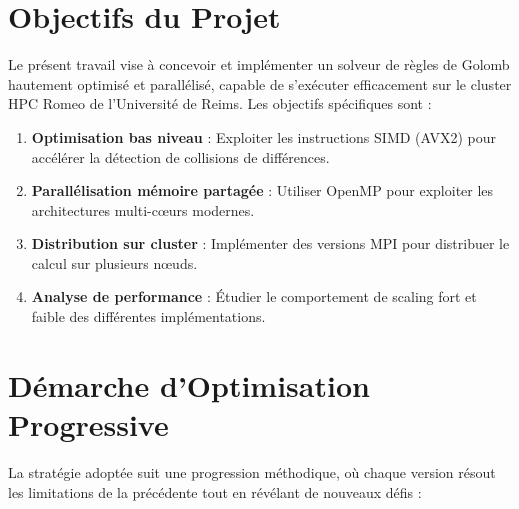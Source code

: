\documentclass[12pt,a4paper,twoside]{report}
\begin{document}
\section{Objectifs du Projet}

Le présent travail vise à concevoir et implémenter un solveur de règles de Golomb hautement optimisé et parallélisé, capable de s'exécuter efficacement sur le cluster HPC Romeo de l'Université de Reims. Les objectifs spécifiques sont :

\begin{enumerate}[leftmargin=*]
    \item \textbf{Optimisation bas niveau} : Exploiter les instructions SIMD (AVX2) pour accélérer la détection de collisions de différences.

    \item \textbf{Parallélisation mémoire partagée} : Utiliser OpenMP pour exploiter les architectures multi-cœurs modernes.

    \item \textbf{Distribution sur cluster} : Implémenter des versions MPI pour distribuer le calcul sur plusieurs nœuds.

    \item \textbf{Analyse de performance} : Étudier le comportement de scaling fort et faible des différentes implémentations.
\end{enumerate}

\section{Démarche d'Optimisation Progressive}

La stratégie adoptée suit une progression méthodique, où chaque version résout les limitations de la précédente tout en révélant de nouveaux défis :
\end{document}
